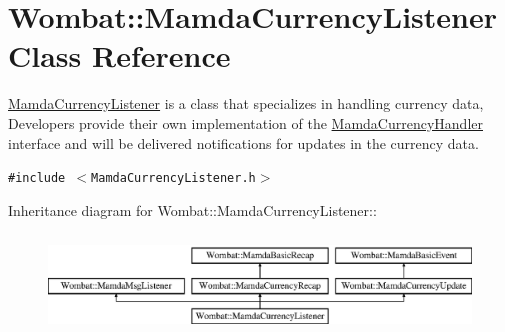 \hypertarget{classWombat_1_1MamdaCurrencyListener}{
\section{Wombat::Mamda\-Currency\-Listener Class Reference}
\label{classWombat_1_1MamdaCurrencyListener}
}
\hyperlink{classWombat_1_1MamdaCurrencyListener}{Mamda\-Currency\-Listener} is a class that specializes in handling currency data, Developers provide their own implementation of the \hyperlink{classWombat_1_1MamdaCurrencyHandler}{Mamda\-Currency\-Handler} interface and will be delivered notifications for updates in the currency data.  


{\tt \#include $<$Mamda\-Currency\-Listener.h$>$}

Inheritance diagram for Wombat::Mamda\-Currency\-Listener::\begin{figure}[H]
\begin{center}
\leavevmode
\includegraphics[height=2.66667cm]{classWombat_1_1MamdaCurrencyListener}
\end{center}
\end{figure}
